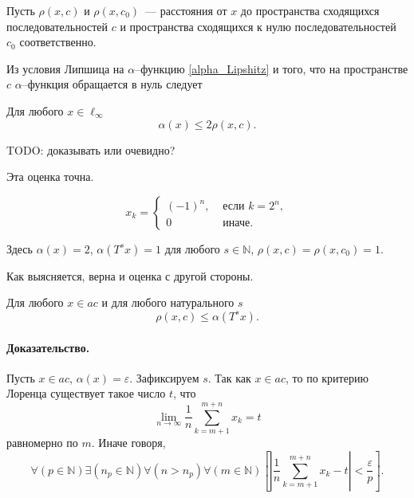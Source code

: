 Пусть $\rho(x,c)$ и $\rho(x,c_0)$~--- расстояния от $x$ до пространства сходящихся последовательностей $c$
и пространства сходящихся к нулю последовательностей $c_0$ соответственно.

Из условия Липшица на $\alpha$--функцию \eqref{alpha_Lipshitz}
и того, что на пространстве $c$
$\alpha$--функция обращается в нуль следует

\begin{lemma}
\label{thm:alpha_x_leq_2_rho_x_c}
	Для любого $x\in\ell_\infty$
	\begin{equation}
		\alpha(x) \leq 2\rho(x, c)
		.
	\end{equation}
\end{lemma}

TODO: доказывать или очевидно?

Эта оценка точна.
\begin{example}
\label{ex:alpha_ac_rho_x_c}
	\begin{equation}
	\label{eq:alpha_ac_distance_example_y}
		x_k = \begin{cases}
			(-1)^n, &\mbox{~если~} k = 2^n,
			\\
			0 &\mbox{~иначе.}
		\end{cases}
	\end{equation}
\end{example}
Здесь $\alpha(x) = 2$, $\alpha(T^s x) = 1$ для любого $s\in\mathbb{N}$, $\rho(x,c) = \rho(x, c_0) = 1$.

Как выясняется, верна и оценка с другой стороны.

\begin{lemma}
\label{thm:rho_x_c_leq_alpha_t_s_x}
	Для любого $x\in ac$ и для любого натурального $s$
	\begin{equation}
		\rho(x,c)\leq \alpha(T^s x)
		.
	\end{equation}
\end{lemma}
\paragraph{Доказательство.}
Пусть $x\in ac$, $\alpha(x)=\varepsilon$.
Зафиксируем $s$.
Так как $x\in ac$, то по критерию Лоренца существует такое число $t$,
что
\begin{equation}
	\lim_{n\to\infty} \frac{1}{n} \sum_{k=m+1}^{m+n} x_k = t
\end{equation}
равномерно по $m$.
Иначе говоря,
\begin{equation}
	\forall(p\in\mathbb{N})
	\exists(n_p \in\mathbb{N})\forall(n>n_p)\forall(m\in\mathbb{N})
	\left[
		\left|
			\frac{1}{n}\sum_{k=m+1}^{m+n} x_k
			-t
		\right|
		<\frac{\varepsilon}{p}
	\right]
	.
\end{equation}

